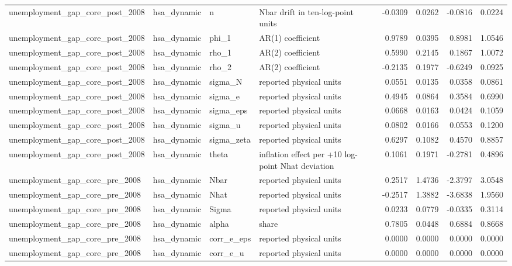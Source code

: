 \begin{tabular}{llllrrrr}
unemployment\_gap\_core\_post\_2008 & hsa\_dynamic & n & Nbar drift in ten-log-point units & -0.0309 & 0.0262 & -0.0816 & 0.0224 \\
unemployment\_gap\_core\_post\_2008 & hsa\_dynamic & phi\_1 & AR(1) coefficient & 0.9789 & 0.0395 & 0.8981 & 1.0546 \\
unemployment\_gap\_core\_post\_2008 & hsa\_dynamic & rho\_1 & AR(2) coefficient & 0.5990 & 0.2145 & 0.1867 & 1.0072 \\
unemployment\_gap\_core\_post\_2008 & hsa\_dynamic & rho\_2 & AR(2) coefficient & -0.2135 & 0.1977 & -0.6249 & 0.0925 \\
unemployment\_gap\_core\_post\_2008 & hsa\_dynamic & sigma\_N & reported physical units & 0.0551 & 0.0135 & 0.0358 & 0.0861 \\
unemployment\_gap\_core\_post\_2008 & hsa\_dynamic & sigma\_e & reported physical units & 0.4945 & 0.0864 & 0.3584 & 0.6990 \\
unemployment\_gap\_core\_post\_2008 & hsa\_dynamic & sigma\_eps & reported physical units & 0.0668 & 0.0163 & 0.0424 & 0.1059 \\
unemployment\_gap\_core\_post\_2008 & hsa\_dynamic & sigma\_u & reported physical units & 0.0802 & 0.0166 & 0.0553 & 0.1200 \\
unemployment\_gap\_core\_post\_2008 & hsa\_dynamic & sigma\_zeta & reported physical units & 0.6297 & 0.1082 & 0.4570 & 0.8857 \\
unemployment\_gap\_core\_post\_2008 & hsa\_dynamic & theta & inflation effect per +10 log-point Nhat deviation & 0.1061 & 0.1971 & -0.2781 & 0.4896 \\
unemployment\_gap\_core\_pre\_2008 & hsa\_dynamic & Nbar & reported physical units & 0.2517 & 1.4736 & -2.3797 & 3.0548 \\
unemployment\_gap\_core\_pre\_2008 & hsa\_dynamic & Nhat & reported physical units & -0.2517 & 1.3882 & -3.6838 & 1.9560 \\
unemployment\_gap\_core\_pre\_2008 & hsa\_dynamic & Sigma & reported physical units & 0.0233 & 0.0779 & -0.0335 & 0.3114 \\
unemployment\_gap\_core\_pre\_2008 & hsa\_dynamic & alpha & share & 0.7805 & 0.0448 & 0.6884 & 0.8668 \\
unemployment\_gap\_core\_pre\_2008 & hsa\_dynamic & corr\_e\_eps & reported physical units & 0.0000 & 0.0000 & 0.0000 & 0.0000 \\
unemployment\_gap\_core\_pre\_2008 & hsa\_dynamic & corr\_e\_u & reported physical units & 0.0000 & 0.0000 & 0.0000 & 0.0000 \\

\end{tabular}
